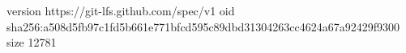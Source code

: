 version https://git-lfs.github.com/spec/v1
oid sha256:a508d5fb97c1fd5b661e771bfcd595c89dbd31304263cc4624a67a92429f9300
size 12781

